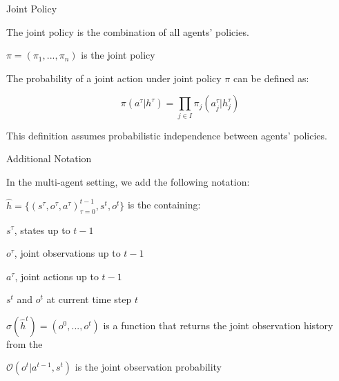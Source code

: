 \begin{frame}{Joint Policy}

    The joint policy is the combination of all agents' policies. 

    \blist
        \item \(\pi = (\pi_1, ..., \pi_n)\) is the joint policy 
    \elist

    The probability of a joint action under joint policy $\pi$ can be defined as:

    \[
        \pi(a^{\tau}|h^{\tau}) = \prod_{j \in I}\pi_{j}(a_{j}^\tau | h^{\tau}_j)
    \]

    \begin{notebox}
        This definition assumes probabilistic independence between agents' policies. 
    \end{notebox}

\end{frame}

\begin{frame}{Additional Notation}

    In the multi-agent setting, we add the following notation: 

    \blist
        \item \(\hat{h} = \{(s^{\tau}, o^{\tau}, a^{\tau})_{\tau = 0}^{t-1}, s^t, o^t\}\) is the  containing:
        \blist
            \item \(s^\tau\), states up to \(t-1\)
            \item \(o^\tau\), joint observations up to \(t-1\)
            \item  \(a^{\tau}\), joint actions up to \(t-1\)
            \item \(s^t\) and \(o^t\) at current time step \(t\)
        \elist
        \item \(\sigma(\hat{h}^t) = (o^0, ..., o^t)\) is a function that returns the joint observation history from the  
        \item \(\mathcal{O}(o^t|a^{t-1}, s^t)\) is the joint observation probability
    \elist
    
\end{frame}

